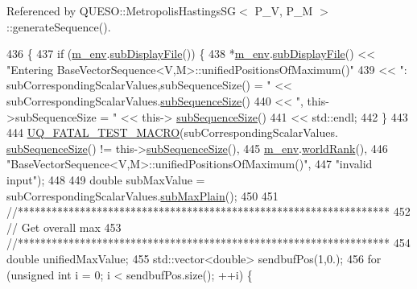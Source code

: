 Referenced by Q\-U\-E\-S\-O\-::\-Metropolis\-Hastings\-S\-G$<$ P\-\_\-\-V, P\-\_\-\-M $>$\-::generate\-Sequence().


\begin{DoxyCode}
436 \{
437   \textcolor{keywordflow}{if} (\hyperlink{class_q_u_e_s_o_1_1_base_vector_sequence_a8e8824d2a63c5a43bcc6473e3a0491e8}{m\_env}.\hyperlink{class_q_u_e_s_o_1_1_base_environment_a8a0064746ae8dddfece4229b9ad374d6}{subDisplayFile}()) \{
438     *\hyperlink{class_q_u_e_s_o_1_1_base_vector_sequence_a8e8824d2a63c5a43bcc6473e3a0491e8}{m\_env}.\hyperlink{class_q_u_e_s_o_1_1_base_environment_a8a0064746ae8dddfece4229b9ad374d6}{subDisplayFile}() << \textcolor{stringliteral}{"Entering
       BaseVectorSequence<V,M>::unifiedPositionsOfMaximum()"}
439                             << \textcolor{stringliteral}{": subCorrespondingScalarValues,subSequenceSize() = "} << 
      subCorrespondingScalarValues.\hyperlink{class_q_u_e_s_o_1_1_scalar_sequence_a0288ea295eedc216a1617b3286f6f3a0}{subSequenceSize}()
440                             << \textcolor{stringliteral}{", this->subSequenceSize = "} << this->
      \hyperlink{class_q_u_e_s_o_1_1_base_vector_sequence_afd6278702d40bdf1044697bbd6ad1957}{subSequenceSize}()
441                             << std::endl;
442   \}
443 
444   \hyperlink{_defines_8h_a56d63d18d0a6d45757de47fcc06f574d}{UQ\_FATAL\_TEST\_MACRO}(subCorrespondingScalarValues.
      \hyperlink{class_q_u_e_s_o_1_1_scalar_sequence_a0288ea295eedc216a1617b3286f6f3a0}{subSequenceSize}() != this->\hyperlink{class_q_u_e_s_o_1_1_base_vector_sequence_afd6278702d40bdf1044697bbd6ad1957}{subSequenceSize}(),
445                       \hyperlink{class_q_u_e_s_o_1_1_base_vector_sequence_a8e8824d2a63c5a43bcc6473e3a0491e8}{m\_env}.\hyperlink{class_q_u_e_s_o_1_1_base_environment_a78b57112bbd0e6dd0e8afec00b40ffa7}{worldRank}(),
446                       \textcolor{stringliteral}{"BaseVectorSequence<V,M>::unifiedPositionsOfMaximum()"},
447                       \textcolor{stringliteral}{"invalid input"});
448 
449   \textcolor{keywordtype}{double} subMaxValue = subCorrespondingScalarValues.\hyperlink{class_q_u_e_s_o_1_1_scalar_sequence_ae4689059a4d99dffd386422f1c1aa4b9}{subMaxPlain}();
450 
451   \textcolor{comment}{//******************************************************************}
452   \textcolor{comment}{// Get overall max}
453   \textcolor{comment}{//******************************************************************}
454   \textcolor{keywordtype}{double} unifiedMaxValue;
455   std::vector<double> sendbufPos(1,0.);
456   \textcolor{keywordflow}{for} (\textcolor{keywordtype}{unsigned} \textcolor{keywordtype}{int} i = 0; i < sendbufPos.size(); ++i) \{

\end{DoxyCode}
